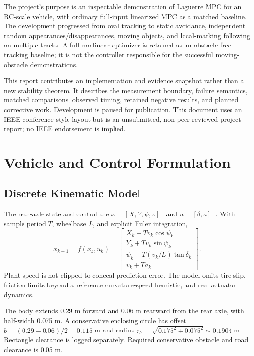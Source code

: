 \documentclass[conference]{IEEEtran}
\begin{document}
The project's purpose is an inspectable demonstration of Laguerre MPC for an
RC-scale vehicle, with ordinary full-input linearized MPC as a matched baseline.
The development progressed from oval tracking to static avoidance, independent
random appearances/disappearances, moving objects, and local-marking following
on multiple tracks. A full nonlinear optimizer is retained as an
obstacle-free tracking baseline; it is not the controller responsible for the
successful moving-obstacle demonstrations.

This report contributes an implementation and evidence snapshot rather than
a new stability theorem. It describes the measurement boundary, failure
semantics, matched comparisons, observed timing, retained negative results,
and planned corrective work. Development is paused for publication.
This document uses an IEEE-conference-style layout but is an unsubmitted,
non-peer-reviewed project report; no IEEE endorsement is implied.

\section{Vehicle and Control Formulation}
\subsection{Discrete Kinematic Model}
The rear-axle state and control are
$x=[X,Y,\psi,v]^\top$ and $u=[\delta,a]^\top$. With sample period $T$,
wheelbase $L$, and explicit Euler integration,
\begin{equation}
x_{k+1}=f(x_k,u_k)=
\begin{bmatrix}
X_k+Tv_k\cos\psi_k\\
Y_k+Tv_k\sin\psi_k\\
\psi_k+T(v_k/L)\tan\delta_k\\
v_k+Ta_k
\end{bmatrix}.
\label{eq:model}
\end{equation}
Plant speed is not clipped to conceal prediction error. The model omits tire
slip, friction limits beyond a reference curvature-speed heuristic, and
real actuator dynamics.

The body extends 0.29 m forward and 0.06 m rearward from the rear axle, with
half-width 0.075 m. A conservative enclosing circle has offset
$b=(0.29-0.06)/2=0.115$ m and radius
$r_b=\sqrt{0.175^2+0.075^2}\simeq0.1904$ m.
Rectangle clearance is logged separately. Required conservative obstacle and
road clearance is 0.05 m.
\end{document}
